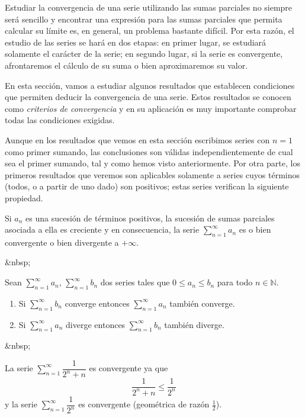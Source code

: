 Estudiar la convergencia de una serie utilizando las sumas parciales no siempre será
sencillo y encontrar una expresión para las sumas parciales que permita calcular su
límite es, en general, un problema bastante difícil. Por esta razón, el estudio de las
series se hará en dos etapas: en primer lugar, se estudiará solamente el carácter de la serie;
en segundo lugar, si la serie es convergente, afrontaremos el cálculo de su suma o bien
aproximaremos su valor.

En esta sección, vamos a estudiar algunos resultados que establecen condiciones que permiten deducir la convergencia de una serie.
Estos resultados se conocen como \emph{criterios de convergencia} y en  su aplicación es muy importante comprobar todas las condiciones exigidas.

Aunque en los resultados que vemos en esta sección escribimos series con $n=1$ como primer sumando, las conclusiones son válidas independientemente de cual sea el primer sumando, tal y como hemos visto anteriormente.
Por otra parte, los primeros resultados que veremos son aplicables solamente a series cuyos términos (todos, o a partir de uno dado) son positivos; estas series verifican la siguiente propiedad.

\begin{proposicion} Si $a_n$ es una sucesión
de términos positivos, la sucesión de sumas parciales asociada
a ella es creciente y en consecuencia, la serie $\displaystyle\sum_{n=1}^\infty  a_n$ es
o bien convergente o bien divergente a $+\infty$.
\end{proposicion}
\begin{rawhtml}
&nbsp;
\end{rawhtml}
\begin{teorema} Sean $\displaystyle\sum_{n=1}^\infty  a_n$,
$\displaystyle\sum_{n=1}^\infty  b_n$ dos series tales que $0\leq a_n\leq b_n$ para todo
$n\in\mathbb{N}$. 
\begin{enumerate}
\item Si $\displaystyle\sum_{n=1}^\infty  b_n$ converge entonces $\displaystyle\sum_{n=1}^\infty  a_n$
también converge.
\item Si $\displaystyle\sum_{n=1}^\infty  a_n$ diverge entonces $\displaystyle\sum_{n=1}^\infty  b_n$
también diverge.
\end{enumerate}
\end{teorema}
\begin{rawhtml}
&nbsp;
\end{rawhtml}
\begin{ejemplo}
La serie $\displaystyle\sum_{n=1}^\infty  \dfrac{1}{2^n+n}$ es convergente ya que 
\[
\dfrac{1}{2^n+n}\leq \dfrac{1}{2^n}
\]
y la serie $\displaystyle\sum_{n=1}^\infty  \dfrac{1}{2^n}$ es convergente (geométrica de razón $\frac12$).
\fej\end{ejemplo}

